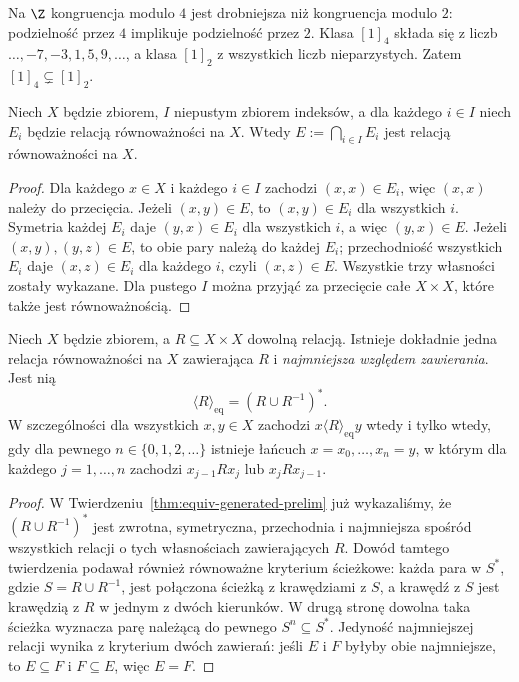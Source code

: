 \begin{przyklad}
Na $\Z$ kongruencja modulo $4$ jest drobniejsza niż
kongruencja modulo $2$: podzielność przez $4$ implikuje
podzielność przez $2$. Klasa $[1]_{4}$ składa się z liczb
$\ldots,-7,-3,1,5,9,\ldots$, a klasa $[1]_{2}$
z wszystkich liczb nieparzystych. Zatem
$[1]_4\subsetneq[1]_2$.
\end{przyklad}

\begin{twierdzenie}
\label{thm:eq-intersection}
Niech $X$ będzie zbiorem, $I$ niepustym zbiorem indeksów,
a dla każdego $i\in I$ niech $E_i$ będzie relacją
równoważności na $X$.
Wtedy $E:=\bigcap_{i\in I}E_i$ jest relacją
równoważności na $X$.
\end{twierdzenie}
\begin{proof}
Dla każdego $x\in X$ i każdego $i\in I$ zachodzi
$(x,x)\in E_i$, więc $(x,x)$ należy do przecięcia.
Jeżeli $(x,y)\in E$, to $(x,y)\in E_i$ dla wszystkich $i$.
Symetria każdej $E_i$ daje $(y,x)\in E_i$ dla wszystkich
$i$, a więc $(y,x)\in E$. Jeżeli $(x,y),(y,z)\in E$,
to obie pary należą do każdej $E_i$; przechodniość
wszystkich $E_i$ daje $(x,z)\in E_i$ dla każdego $i$,
czyli $(x,z)\in E$. Wszystkie trzy własności zostały
wykazane. Dla pustego $I$ można przyjąć za przecięcie
całe $X\times X$, które także jest równoważnością.
\end{proof}

\begin{twierdzenie}
\label{thm:eq-generated}
Niech $X$ będzie zbiorem, a $R\subseteq X\times X$
dowolną relacją. Istnieje dokładnie jedna relacja równoważności
na $X$ zawierająca $R$ i \emph{najmniejsza względem zawierania}.
Jest nią
\[
 \langle R\rangle_{\mathrm{eq}}=(R\cup R^{-1})^*.
\]
W szczególności dla wszystkich $x,y\in X$ zachodzi
$x\langle R\rangle_{\mathrm{eq}}y$ wtedy i tylko wtedy,
gdy dla pewnego $n\in\{0,1,2,\ldots\}$ istnieje łańcuch
$x=x_0,\ldots,x_n=y$, w którym dla każdego $j=1,\ldots,n$
zachodzi $x_{j-1}Rx_j$ lub $x_jRx_{j-1}$.
\end{twierdzenie}
\begin{proof}
W Twierdzeniu~\ref{thm:equiv-generated-prelim} już wykazaliśmy,
że $(R\cup R^{-1})^*$ jest zwrotna, symetryczna,
przechodnia i najmniejsza spośród wszystkich relacji
o tych własnościach zawierających $R$.
Dowód tamtego twierdzenia podawał również równoważne
kryterium ścieżkowe: każda para w $S^*$, gdzie
$S=R\cup R^{-1}$, jest połączona ścieżką z krawędziami
z $S$, a krawędź z $S$ jest krawędzią z $R$ w jednym
z dwóch kierunków. W drugą stronę dowolna taka ścieżka
wyznacza parę należącą do pewnego $S^n\subseteq S^*$.
Jedyność najmniejszej relacji wynika z kryterium dwóch zawierań:
jeśli $E$ i $F$ byłyby obie najmniejsze, to $E\subseteq F$
i $F\subseteq E$, więc $E=F$.
\end{proof}

